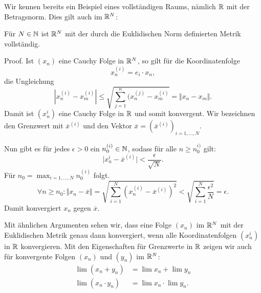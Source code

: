 Wir kennen bereits ein Beispiel eines vollständigen Raums, nämlich \(\mathbb{R}\) mit der Betragsnorm. Dies gilt auch im \(\mathbb{R}^N\):
\label{metrik/konvfolgen:theorem-8}
\begin{theorem}{}{}



Für \(N \in \mathbb{N}\) ist \(\mathbb{R}^N\) mit der durch die Euklidischen Norm definierten Metrik vollständig.
\end{theorem}

\begin{emphBox}{}{}
Proof.  Ist \((x_n)\) eine Cauchy Folge in \(\mathbb{R}^N\), so gilt für die Koordinatenfolge
\begin{equation*}
 x_n^{(i)} = e_i \cdot x_n,
\end{equation*}
die Ungleichung
\begin{equation*}
 | x_n^{(i)} -  x_m^{(i)}  | \leq \sqrt{ \sum_{j=1}^n (x_n^{(j)} -  x_m^{(i)} } = \Vert x_n - x_m \Vert .
\end{equation*}
Damit ist \((x_n^{i})\) eine Cauchy Folge in \(\mathbb{R}\) und somit konvergent. Wir bezeichnen den Grenzwert mit \(\overline{x}^{(i)}\) und den Vektor
\(\overline{x}=(\overline{x}^{(i)})_{i=1,\ldots,N}\).

Nun gibt es für jedes \(\epsilon > 0\) ein \(n_0^{(i)} \in \mathbb{N}\), sodass für alle \( n \geq n_0^{i)}\) gilt:
\begin{equation*}
 \vert x_n^{i} -\overline{x}^{(i)} \vert < \frac{\epsilon}{\sqrt{N}}.
\end{equation*}
Für \(n_0 = \max_{i=1,\ldots,N} n_0^{(i)}\) folgt.
\begin{equation*}
 \forall n \geq n_0: \Vert x_n - \overline{x} \Vert = \sqrt{\sum_{i=1}^N (x_n^{(i)} - \overline{x}^{(i)})^2} < \sqrt{\sum_{i=1}^N \frac{\epsilon^2}N} = \epsilon.
\end{equation*}
Damit konvergiert \(x_n\) gegen \(\overline{x}\).
\end{emphBox}

Mit ähnlichen Argumenten sehen wir, dass eine Folge \((x_n)\) im \(\mathbb{R}^N\) mit der Euklidischen Metrik genau dann konvergiert, wenn alle Koordinatenfolgen \((x_n^{i})\) in \(\mathbb{R}\) konvergieren. Mit den Eigenschaften für Grenzwerte in \(\mathbb{R}\) zeigen wir auch für konvergente Folgen \((x_n)\) und \((y_n)\) im \(\mathbb{R}^N\):
\begin{align*}
\lim (x_n + y_n) &= \lim x_n + \lim y_n \\
\lim (x_n \cdot y_n) &= \lim x_n \cdot \lim y_n.
\end{align*}

